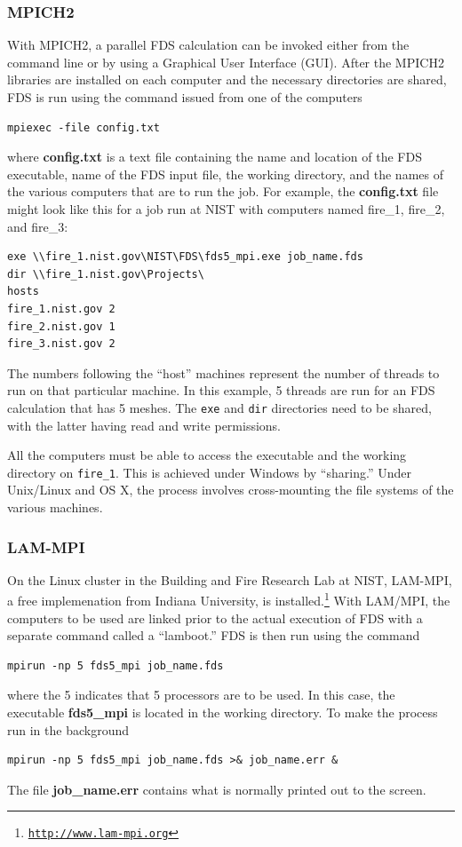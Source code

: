 \documentclass[11pt]{book}
\newcommand{\ct}{\tt\small}
\begin{document}
\subsubsection{MPICH2}
With MPICH2, a parallel FDS calculation can be invoked either
from the command line or by using a Graphical User Interface
(GUI). After the MPICH2 libraries are installed on each computer and
the necessary directories are shared, FDS is run using the command
issued from one of the computers
\begin{verbatim}
mpiexec -file config.txt
\end{verbatim}
where {\bf config.txt} is a text file containing the name and location
of the FDS executable, name of the FDS input file, the working directory,
and the names of the various computers that are to run the job. For
example, the {\bf config.txt} file might look like this for a job run at NIST with computers named
fire\_1, fire\_2, and fire\_3:
\begin{verbatim}
exe \\fire_1.nist.gov\NIST\FDS\fds5_mpi.exe job_name.fds
dir \\fire_1.nist.gov\Projects\
hosts
fire_1.nist.gov 2
fire_2.nist.gov 1
fire_3.nist.gov 2
\end{verbatim}
The numbers following the ``host'' machines represent the number of threads to run on that particular machine. In this
example, 5 threads are run for an FDS calculation that has 5 meshes. The {\ct exe} and {\ct dir} directories need to be shared, with the
latter having read and write permissions.

\begin{warning}
\noindent
All the computers must be able to access the executable and the working directory on {\ct fire\_1}.
This is achieved under Windows by ``sharing.'' Under Unix/Linux and OS X, the process involves cross-mounting the file
systems of the various machines.
\end{warning}


\subsubsection{LAM-MPI}
On the Linux cluster in the Building and Fire Research Lab at NIST, LAM-MPI, a free implemenation from Indiana University,
is installed.\footnote{\href{http://www.lam-mpi.org}{{\ct http://www.lam-mpi.org}}}
With LAM/MPI, the computers to be used are linked prior to the actual execution of FDS with a separate
command called a ``lamboot.''
FDS is then run using the command
\begin{verbatim}
mpirun -np 5 fds5_mpi job_name.fds
\end{verbatim}
where the 5 indicates that 5 processors are to be used. In this case, the executable {\bf fds5\_mpi} is located in the
working directory. To make the process run in the background
\begin{verbatim}
mpirun -np 5 fds5_mpi job_name.fds >& job_name.err &
\end{verbatim}
The file {\bf job\_name.err} contains what is normally printed out to the screen.
\end{document}
